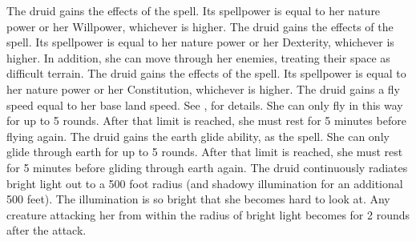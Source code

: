          The druid gains the effects of the  spell.
        Its spellpower is equal to her nature power or her Willpower, whichever is higher.
         The druid gains the effects of the  spell.
        Its spellpower is equal to her nature power or her Dexterity, whichever is higher.
        In addition, she can move through her enemies, treating their space as difficult terrain.
         The druid gains the effects of the  spell.
        Its spellpower is equal to her nature power or her Constitution, whichever is higher.
         The druid gains a fly speed equal to her base land speed.
        See , for details.
        She can only fly in this way for up to 5 rounds.
        After that limit is reached, she must rest for 5 minutes before flying again.
        The druid gains the earth glide ability, as the  spell.
        She can only glide through earth for up to 5 rounds.
        After that limit is reached, she must rest for 5 minutes before gliding through earth again.
        The druid continuously radiates bright light out to a 500 foot radius (and shadowy illumination for an additional 500 feet).
        The illumination is so bright that she becomes hard to look at.
        Any creature attacking her from within the radius of bright light becomes \partiallyblinded for 2 rounds after the attack.

